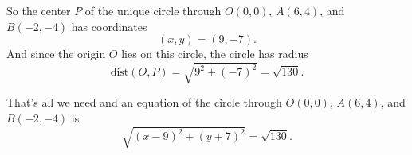 \documentclass{ximera}
\begin{document}
\begin{question}
\begin{explanation}
So the center $P$ of the unique circle through $O(0,0)$, $A(6,4)$, and $B(-2,-4)$ has coordinates
\[
    (x,y) = (9, -7).
\]
And since the origin $O$ lies on this circle, the circle has radius 
\[
   \text{dist}(O,P) = \sqrt{9^2 + (-7)^2} = \sqrt{130}.
\]
 
That's all we need and an equation of the circle through $O(0,0)$, $A(6,4)$, and $B(-2,-4)$ is
\[
  \sqrt{(x-9)^2 + (y+7)^2} = \sqrt{130} .
\]

\end{explanation}

\end{question}





\end{document}
